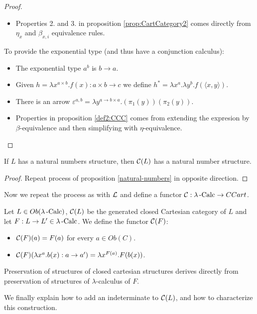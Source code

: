 \begin{definition}
\begin{proof}
\begin{itemize}
  \item Properties 2. and 3. in proposition \ref{prop:CartCategory2} comes directly from $\eta_x$ and $\beta_{x,i}$ equivalence rules.\\
  \end{itemize}
  To provide the exponential type (and thus have a conjunction calculus):
  \begin{itemize}
  \item The exponential type $a^b$ is $b\to a$.
  \item Given $h = \lambda x^{a\times b}. f(x): a\times b \to c$  we define $h^* = \lambda x^a. \lambda y^b. f(\langle x,y\rangle)$.
  \item There is an arrow $\varepsilon^{a,b} = \lambda y^{a\to b \times a}. (\pi_1(y))(\pi_2(y))$.
  \item Properties in proposition \ref{def2:CCC} comes from extending the expresion by $\beta$-equivalence and then simplifying with $\eta$-equivalence.
  \end{itemize}
\end{proof}

\begin{proposition}
  If $L$ has a natural numbers structure, then $\mathcal{C} (L)$ has a natural number structure.
\end{proposition}
\begin{proof}
  Repeat process of proposition \ref{natural-numbers} in opposite direction.
\end{proof}
Now we repeat the process as with $\mathcal{L}$ and define a functor $\mathcal{C}: \lambda\operatorname{-Calc} \to CCart$.
\begin{definition}
  Let $L\in Ob(\lambda\operatorname{-Calc})$, $\mathcal{C} (L)$ be the generated closed Cartesian category of $L$ and let $F:L\to L'\in \lambda\operatorname{-Calc}$.  We define the functor $\mathcal{C} (F)$:
  \begin{itemize}
  \item $\mathcal{C} (F) (a) = F(a)$ for every $a\in Ob(C)$.
  \item $\mathcal{C} (F) (\lambda x^a. b(x) :a \to a') = \lambda x^{F(a)}. F(b(x))$.
  \end{itemize}
\end{definition}
\begin{remark}
  Preservation of structures of closed cartesian structures derives directly from preservation of structures of $\lambda$-calculus of $F$.
\end{remark}

We finally explain how to add an indeterminate to $\mathcal{C}(L)$, and how to characterize this construction.


\end{definition}
